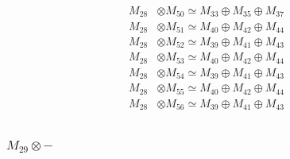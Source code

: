 \begin{align*}
M_{28} &\otimes M_{50} \simeq M_{33} \oplus M_{35} \oplus M_{37} \\
M_{28} &\otimes M_{51} \simeq M_{40} \oplus M_{42} \oplus M_{44} \\
M_{28} &\otimes M_{52} \simeq M_{39} \oplus M_{41} \oplus M_{43} \\
M_{28} &\otimes M_{53} \simeq M_{40} \oplus M_{42} \oplus M_{44} \\
M_{28} &\otimes M_{54} \simeq M_{39} \oplus M_{41} \oplus M_{43} \\
M_{28} &\otimes M_{55} \simeq M_{40} \oplus M_{42} \oplus M_{44} \\
M_{28} &\otimes M_{56} \simeq M_{39} \oplus M_{41} \oplus M_{43} \\
\end{align*}

\subsubsection{$ M_{29}\otimes -$}
